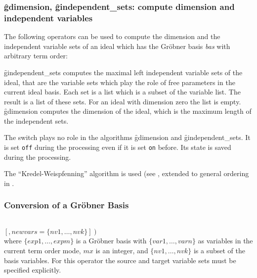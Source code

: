 \subsubsection{\f{gdimension}, \f{gindependent\_sets}: compute dimension and
independent variables}
The following operators can be used to compute the dimension
and the independent variable sets of an ideal which has the
Gr\"obner basis {\it bas} with arbitrary term order:
\begin{description}
\item[\f{gdimension bas}]
  \hypertarget{operator:GDIMENSION}{}
\item[\f{gindependent\_sets bas}]
  \hypertarget{operator:GINDEPENDENT_SETS}{}
\f{gindependent\_sets} computes the maximal
left independent variable sets of the ideal, that are
the variable sets which play the role of free parameters in the
current ideal basis. Each set is a list which is a subset of the
variable list. The result is a list of these sets. For an
ideal with dimension zero the list is empty.
\f{gdimension} computes the dimension of the ideal,
which is the maximum length of the independent sets.
\end{description}

The switch  plays no role in the algorithms \f{gdimension} and
\f{gindependent\_sets}. It is set \texttt{off} during the processing even if
it is set \texttt{on} before. Its state is saved during the processing.

The ``Kredel-Weispfenning'' algorithm is used (see \cite{Kredel:88a},
extended to general ordering in \cite{Becker:93}.

\subsubsection{Conversion of a Gr\"obner Basis}

\begin{description}
\item[{\f{glexconvert}$\left(\{exp,\ldots , expm\} \left[,\{var1
        \ldots , varn\}\right]\left[,maxdeg=mx\right]\right.$}]\mbox{}\\
  \hypertarget{operator:GLEXCONVERT}{}
$\left.\left[,newvars=\{nv1, \ldots , nvk\}\right]\right)$ \\
where $\{exp1, \ldots , expm\}$ is a Gr\"obner basis with
$\{var1, \ldots , varn\}$ as variables in the current term order mode,
$mx$ is an integer, and
$\{nv1, \ldots , nvk\}$ is a subset of the basis variables.
For this operator the source and target variable sets must be specified
explicitly.
\end{description}

